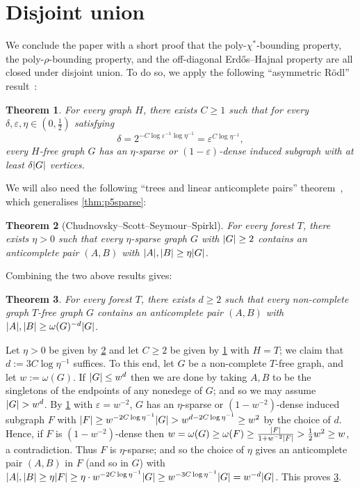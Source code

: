 \documentclass[11pt,reqno]{amsart}
\newtheorem{theorem}{Theorem}[section]
\let\oldendproof\endproof
\renewenvironment{proof}[1][\proofname]{%
	\oldproof[\normalfont\bfseries #1]%
}{\oldendproof}
\newcommand{\dd}{\textquotedblleft}
\newcommand{\ee}{\textquotedblright}
\newcommand{\eps}{\varepsilon}
\newcommand{\erh}{Erd\H{o}s--Hajnal}
\newcommand{\chis}{\chi^*}
\DeclarePairedDelimiter\abs{\lvert}{\rvert}%
\begin{document}
	\section{Disjoint union}
	\label{sec:union}
	We conclude the paper with a short proof that the poly-$\chis$-bounding property, the poly-$\rho$-bounding property, and the off-diagonal \erh{} property are all closed under disjoint union.
	To do so, we apply the following \dd asymmetric R\"odl\ee{} result~\cite[Theorem 6.7]{2025thes}:
	\begin{theorem}
		\label{thm:arodl}
		For every graph $H$, there exists $C\ge1$ such that for every $\delta,\eps,\eta\in(0,\frac12)$ satisfying
		\[\delta=2^{-C\log\eps^{-1}\log\eta^{-1}}
		=\eps^{C\log\eta^{-1}},\]
		every $H$-free graph $G$ has an $\eta$-sparse or $(1-\eps)$-dense induced subgraph with at least $\delta\abs G$ vertices.
	\end{theorem}
	We will also need the following \dd trees and linear anticomplete pairs\ee{} theorem~\cite{MR4170220}, which generalises \cref{thm:p5sparse}:
	\begin{theorem}
		[Chudnovsky--Scott--Seymour--Spirkl]
		\label{thm:tree}
		For every forest $T$, there exists $\eta>0$ such that every $\eta$-sparse graph $G$ with $\abs G\ge 2$ contains an anticomplete pair $(A,B)$ with $\abs A,\abs B\ge \eta\abs G$.
	\end{theorem}
	Combining the two above results gives:
	\begin{theorem}
		\label{thm:wanti}
		For every forest $T$, there exists $d\ge2$ such that every non-complete graph $T$-free graph $G$ contains an anticomplete pair $(A,B)$ with $\abs A,\abs B\ge \omega(G)^{-d}\abs G$.
	\end{theorem}
	\begin{proof}
		Let $\eta>0$ be given by \cref{thm:tree} and let $C\ge2$ be given by \cref{thm:arodl} with $H=T$;
		we claim that $d:=3C\log\eta^{-1}$ suffices.
		To this end, let $G$ be a non-complete $T$-free graph, and let  $w:=\omega(G)$.
		If $\abs G\le w^d$ then we are done by taking $A,B$ to be the singletons of the endpoints of any nonedege of $G$;
		and so we may assume $\abs G>w^d$.
		By \cref{thm:arodl} with $\eps=w^{-2}$, $G$ has an $\eta$-sparse or $(1-w^{-2})$-dense induced subgraph $F$ with $\abs F\ge w^{-2C\log\eta^{-1}}\abs G>w^{d-2C\log\eta^{-1}}\ge w^2$ by the choice of $d$.
		Hence, if $F$ is $(1-w^{-2})$-dense then $w=\omega(G)\ge\omega(F)\ge\frac{\abs F}{1+w^{-2}\abs F}>\frac12w^2\ge w$, a contradiction.
		Thus $F$ is $\eta$-sparse;
		and so the choice of $\eta$ gives an anticomplete pair $(A,B)$ in $F$ (and so in $G$) with $\abs A,\abs B\ge \eta\abs F\ge \eta\cdot w^{-2C\log\eta^{-1}}\abs G\ge w^{-3C\log\eta^{-1}}\abs G=w^{-d}\abs G$.
		This proves \cref{thm:wanti}.
	\end{proof}
\end{document}
